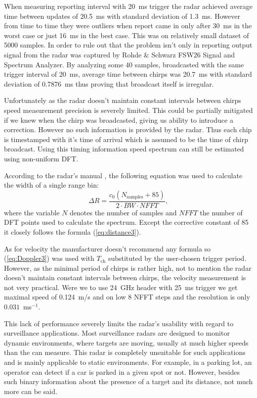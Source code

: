 When measuring reporting interval with 20~ms trigger the radar achieved average time between updates of 20.5~ms with standard deviation of 1.3~ms.
However from time to time they were outliers when report came in only after 30~ms in the worst case or just 16~ms in the best case.
This was on relatively small dataset of 5000 samples.
In order to rule out that the problem isn't only in reporting output signal from the radar was captured by Rohde \& Schwarz FSW26 Signal and Spectrum Analyzer.
By analyzing some 40 samples, broadcasted with the same trigger interval of 20~ms, average time between chirps was 20.7~ms with standard deviation of 0.7876~ms thus proving that broadcast itself is irregular.

Unfortunately as the radar doesn't maintain constant intervals between chirps speed measurement precision is severely limited.
This could be partially mitigated if we knew when the chirp was broadcasted, giving us ability to introduce a correction.
However no such information is provided by the radar.
Thus each chip is timestamped with it's time of arrival which is assumed to be the time of chirp broadcast.
Using this timing information speed spectrum can still be estimated using non-uniform DFT.

According to the radar's manual \cite{siradPRO}, the following equation was used to calculate the width of a single range bin:
\begin{equation}
	\Delta R = \frac{c_0 (N_\mathrm{samples}+85)}{2\cdot BW\cdot NFFT},
  \label{eq:rangeBin}
\end{equation}
where the variable $N$ denotes the number of samples and $NFFT$ the number of DFT points used to calculate the spectrum.
Except the corrective constant of 85 it closely follows the formula (\ref{eq:distance3}).

As for velocity the manufacturer doesn't recommend any formula so (\ref{eq:Doppler3}) was used with $T_\mathrm{ch}$ substituted by the user-chosen trigger period.
However, as the minimal period of chirps is rather high, not to mention the radar doesn't maintain constant intervals between chirps, the velocity measurement is not very practical.
Were we to use 24~GHz header with 25~ms trigger we get maximal speed of 0.124~m/s and on low 8 NFFT steps and the resolution is only $0.031$~ms$^{-1}$.

This lack of performance severely limits the radar's usability with regard to surveillance applications.
Most surveillance radars are designed to monitor dynamic environments, where targets are moving, usually at much higher speeds than the \sirad can measure.
This radar is completely unsuitable for such applications and is mainly applicable to static environments.
For example, in a parking lot, an operator can detect if a car is parked in a given spot or not.
However, besides such binary information about the presence of a target and its distance, not much more can be said.

